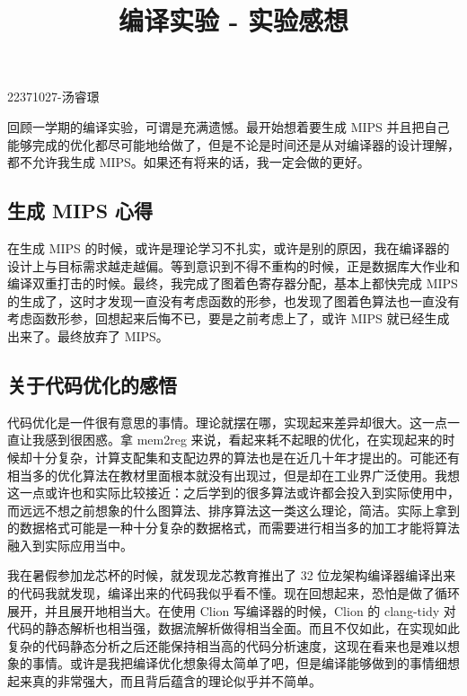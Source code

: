 \documentclass[a4paper]{article}
\title{编译实验 - 实验感想}
\date{}
\begin{document}
	\maketitle
	\vspace{-6em} %
	
	\begin{center}22371027-汤睿璟\end{center}
	
	
	回顾一学期的编译实验，可谓是充满遗憾。最开始想着要生成 MIPS 并且把自己能够完成的优化都尽可能地给做了，但是不论是时间还是从对编译器的设计理解，都不允许我生成 MIPS。如果还有将来的话，我一定会做的更好。
	
	\subsection{生成 MIPS 心得}
	
		在生成 MIPS 的时候，或许是理论学习不扎实，或许是别的原因，我在编译器的设计上与目标需求越走越偏。等到意识到不得不重构的时候，正是数据库大作业和编译双重打击的时候。最终，我完成了图着色寄存器分配，基本上都快完成 MIPS 的生成了，这时才发现一直没有考虑函数的形参，也发现了图着色算法也一直没有考虑函数形参，回想起来后悔不已，要是之前考虑上了，或许 MIPS 就已经生成出来了。最终放弃了 MIPS。
		
	\subsection{关于代码优化的感悟}
	
		代码优化是一件很有意思的事情。理论就摆在哪，实现起来差异却很大。这一点一直让我感到很困惑。拿 mem2reg 来说，看起来耗不起眼的优化，在实现起来的时候却十分复杂，计算支配集和支配边界的算法也是在近几十年才提出的。可能还有相当多的优化算法在教材里面根本就没有出现过，但是却在工业界广泛使用。我想这一点或许也和实际比较接近：之后学到的很多算法或许都会投入到实际使用中，而远远不想之前想象的什么图算法、排序算法这一类这么理论，简洁。实际上拿到的数据格式可能是一种十分复杂的数据格式，而需要进行相当多的加工才能将算法融入到实际应用当中。
		
		我在暑假参加龙芯杯的时候，就发现龙芯教育推出了 32 位龙架构编译器编译出来的代码我就发现，编译出来的代码我似乎看不懂。现在回想起来，恐怕是做了循环展开，并且展开地相当大。在使用 Clion 写编译器的时候，Clion 的 clang-tidy 对代码的静态解析也相当强，数据流解析做得相当全面。而且不仅如此，在实现如此复杂的代码静态分析之后还能保持相当高的代码分析速度，这现在看来也是难以想象的事情。或许是我把编译优化想象得太简单了吧，但是编译能够做到的事情细想起来真的非常强大，而且背后蕴含的理论似乎并不简单。
		
\end{document}
